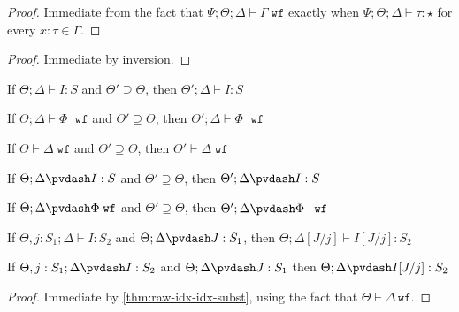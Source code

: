 \ctxwfstreng*
\begin{proof}
Immediate from the fact that $\Psi ; \Theta ; \Delta \vdash \Gamma \; \texttt{wf}$ exactly when $\Psi ; \Theta ; \Delta \vdash \tau : \star$ for every $x : \tau \in \Gamma$.
\end{proof}

\conwfstreng*
\begin{proof}
Immediate by inversion.
\end{proof}

\begin{theorem}
If $\Theta ; \Delta \vdash I : S$ and $\Theta' \supseteq \Theta$, then $\Theta' ; \Delta \vdash I : S$
\end{theorem}

\begin{theorem}
If $\Theta ; \Delta \vdash \Phi \; \texttt{ wf}$ and $\Theta' \supseteq \Theta$, then $\Theta' ; \Delta \vdash \Phi \; \texttt{ wf}$
\end{theorem}

\begin{theorem}
If $\Theta \vdash \Delta \; \texttt{wf}$ and $\Theta' \supseteq \Theta$, then $\Theta' \vdash \Delta \; \texttt{wf}$
\end{theorem}

\begin{theorem}
If $\Theta ; \Delta \pvdash I : S$ and $\Theta' \supseteq \Theta$, then $\Theta' ; \Delta \pvdash I : S$
\end{theorem}

\begin{theorem}
If $\Theta ; \Delta \pvdash \Phi \; \texttt{wf}$ and $\Theta' \supseteq \Theta$, then $\Theta' ; \Delta \pvdash \Phi \; \texttt{ wf}$
\end{theorem}

\begin{theorem}
If $\Theta, j : S_1 ; \Delta \vdash I : S_2$ and $\Theta ; \Delta \pvdash J : S_1$, then 
$\Theta ; \Delta[J/j] \vdash I[J/j] : S_2$
\label{thm:raw-idx-idx-subst}
\end{theorem}


\begin{theorem}
If $\Theta, j : S_1 ; \Delta \pvdash I : S_2$ and $\Theta ; \Delta \pvdash J : S_1$ then $\Theta ; \Delta \pvdash I[J/j] : S_2$
\label{thm:idx-idx-subst}
\end{theorem}
\begin{proof}
Immediate by \autoref{thm:raw-idx-idx-subst}, using the fact that $\Theta \vdash \Delta \, \texttt{wf}$.
\end{proof}

